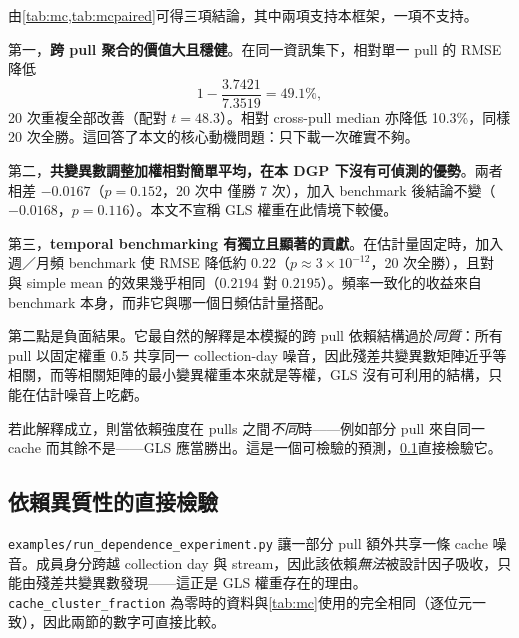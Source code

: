 \documentclass[12pt,a4paper,oneside]{article}
\begin{document}
由\cref{tab:mc,tab:mcpaired}可得三項結論，其中兩項支持本框架，一項不支持。

第一，\textbf{跨 pull 聚合的價值大且穩健}。在同一資訊集下，\RACER 相對單一 pull 的 RMSE 降低
\begin{equation}
1-\frac{3.7421}{7.3519}=49.1\%,
\end{equation}
20 次重複全部改善（配對 $t=48.3$）。相對 cross-pull median 亦降低 10.3\%，同樣 20 次全勝。這回答了本文的核心動機問題：只下載一次確實不夠。

第二，\textbf{共變異數調整加權相對簡單平均，在本 DGP 下沒有可偵測的優勢}。兩者相差 $-0.0167$（$p=0.152$，20 次中 \RACER 僅勝 7 次），加入 benchmark 後結論不變（$-0.0168$，$p=0.116$）。本文不宣稱 GLS 權重在此情境下較優。

第三，\textbf{temporal benchmarking 有獨立且顯著的貢獻}。在估計量固定時，加入週／月頻 benchmark 使 RMSE 降低約 $0.22$（$p\approx3\times10^{-12}$，20 次全勝），且對 \RACER 與 simple mean 的效果幾乎相同（$0.2194$ 對 $0.2195$）。頻率一致化的收益來自 benchmark 本身，而非它與哪一個日頻估計量搭配。

\begin{remark}[一個可檢驗的預測]
\label{rem:prediction}
第二點是負面結果。它最自然的解釋是本模擬的跨 pull 依賴結構過於\emph{同質}：所有 pull 以固定權重 0.5 共享同一 collection-day 噪音，因此殘差共變異數矩陣近乎等相關，而等相關矩陣的最小變異權重本來就是等權，GLS 沒有可利用的結構，只能在估計噪音上吃虧。

若此解釋成立，則當依賴強度在 pulls 之間\emph{不同}時——例如部分 pull 來自同一 cache 而其餘不是——GLS 應當勝出。這是一個可檢驗的預測，\cref{sec:depexp}直接檢驗它。
\end{remark}

\subsection{依賴異質性的直接檢驗}
\label{sec:depexp}

\texttt{examples/run\_dependence\_experiment.py} 讓一部分 pull 額外共享一條 cache 噪音。成員身分跨越 collection day 與 stream，因此該依賴\emph{無法}被設計因子吸收，只能由殘差共變異數發現——這正是 GLS 權重存在的理由。\texttt{cache\_cluster\_fraction} 為零時的資料與\cref{tab:mc}使用的完全相同（逐位元一致），因此兩節的數字可直接比較。
\end{document}
